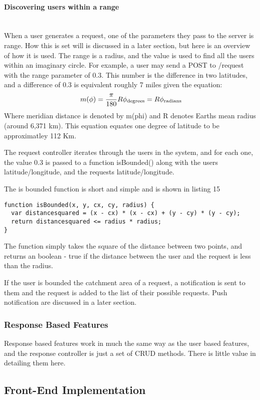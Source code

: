 \documentclass[a4paper]{article}
\newcommand{\subsubsubsection}[1]{\paragraph{#1}\mbox{}\\}
\begin{document}
\subsubsubsection{Discovering users within a range}
When a user generates a request, one of the parameters they pass to the server is range. How this is set will is discussed in a later section, but here is an overview of how it is used.
The range is a radius, and the value is used to find all the users within an imaginary circle. 
For example, a user may send a POST to /request with the range parameter of 0.3. This number is the difference in two latitudes, and a difference of 0.3 is equivalent roughly 7 miles given the equation:
\begin{equation}
\ m(\phi)=\frac{\pi}{180}R\phi_{\rm degrees}= R\phi_{\rm radians}
\end{equation}
 Where meridian distance is denoted by m(phi)
and R denotes Earths mean radius (around 6,371 km). This equation equates one degree of latitude to be approximatley 112 Km.

The request controller iterates through the users in the system, and for each one,
the value 0.3 is passed to a function isBounded() along with the users latitude/longitude, and the requests latitude/longitude.

The is bounded function is short and simple and is shown in listing 15

\begin{lstlisting}[label=isBounded(),caption=isBounded()]
function isBounded(x, y, cx, cy, radius) {
  var distancesquared = (x - cx) * (x - cx) + (y - cy) * (y - cy);
  return distancesquared <= radius * radius;
}
\end{lstlisting}

The function simply takes the square of the distance between two points, and returns an boolean - true if the distance between the user and the request is less than the radius.

If the user is bounded the catchment area of a request, a notification is sent to them and the request is added to the list of their possible requests. Push notification are discussed in a later section.


\subsubsection{Response Based Features}
Response based features work in much the same way as the user based features, and the response controller is just a set of CRUD methods. There is little value in detailing them here.

\subsection{Front-End Implementation}
\end{document}
